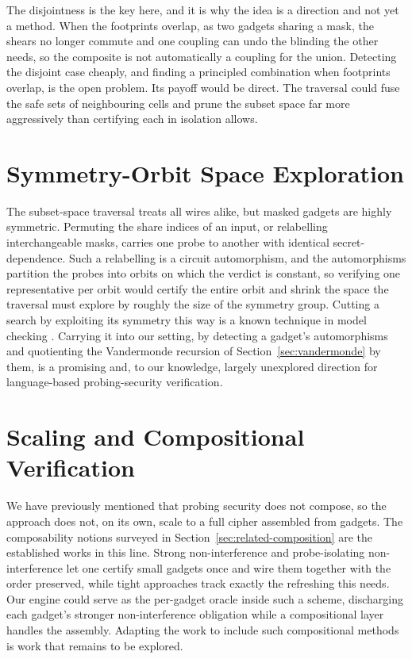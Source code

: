 The disjointness is the key here, and it is why the idea is a direction and not
yet a method. When the footprints overlap, as two gadgets sharing a mask, the
shears no longer commute and one coupling can undo the blinding the other needs,
so the composite is not automatically a coupling for the union. Detecting the
disjoint case cheaply, and finding a principled combination when footprints
overlap, is the open problem. Its payoff would be direct. The traversal could fuse
the safe sets of neighbouring cells and prune the subset space far more
aggressively than certifying each in isolation allows.

\section{Symmetry-Orbit Space Exploration} %
\label{sec:fw-symmetry}

The subset-space traversal treats all wires alike, but masked gadgets are highly
symmetric. Permuting the share indices of an input, or relabelling interchangeable
masks, carries one probe to another with identical secret-dependence. Such a
relabelling is a circuit automorphism, and the automorphisms partition the probes
into orbits on which the verdict is constant, so verifying one representative per
orbit would certify the entire orbit and shrink the space the traversal must
explore by roughly the size of the symmetry group. Cutting a search by exploiting
its symmetry this way is a known technique in model checking
\parencite{clarke1996exploiting}. Carrying it into our setting, by detecting a
gadget's automorphisms and quotienting the Vandermonde recursion of
Section~\ref{sec:vandermonde} by them, is a promising and, to our knowledge,
largely unexplored direction for language-based probing-security verification.

\section{Scaling and Compositional Verification}
\label{sec:fw-composition}

We have previously mentioned that probing security does
not compose, so the approach does not, on its own, scale to a full cipher assembled
from gadgets. The composability notions surveyed in
Section~\ref{sec:related-composition} are the established works in this line. Strong
non-interference \parencite{barthe2016strong} and probe-isolating non-interference
\parencite{cassiers2020trivially} let one certify small gadgets once and wire them
together with the order preserved, while tight approaches
\parencite{belaid2018tight} track exactly the refreshing this needs. Our engine
could serve as the per-gadget oracle inside such a scheme, discharging each
gadget's stronger non-interference obligation while a compositional layer handles
the assembly. Adapting the work to include such compositional methods is work that remains
to be explored.

